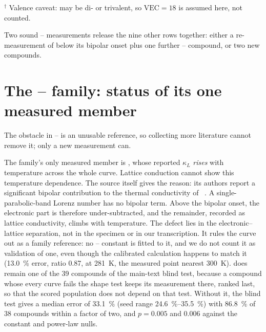 \documentclass[preprint, 12pt]{elsarticle}
\begin{document}
\begin{table}[htb]
  \vspace{2pt}
  \begin{minipage}{\linewidth}\footnotesize
    $^{\dagger}$ Valence caveat:  may be di- or trivalent, so $\mathrm{VEC}=18$ is assumed here, not
    counted.\par
    Two sound -- measurements release the nine other rows together: either a
    re-measurement of  below its bipolar onset plus one further -- compound,
    or two new compounds.
  \end{minipage}
\end{table}

\section{The \texorpdfstring{--}{Ni-Bi} family: status of its one measured member}
\label{sec:nibi}

The obstacle in -- is an unusable reference, so collecting more literature cannot
remove it; only a new measurement can.

The family's only measured member is , whose reported $\kappa_L$ \emph{rises} with
temperature across the whole curve. Lattice conduction cannot show this temperature dependence. The
source itself gives the reason: its authors report a significant bipolar contribution to the thermal
conductivity of ~\cite{li2015synthesis}. A single-parabolic-band Lorenz number has no
bipolar term. Above the bipolar onset, the electronic part is therefore under-subtracted, and the
remainder, recorded as lattice conductivity, climbs with temperature. The defect lies in the
electronic--lattice separation, not in the specimen or in our transcription. It rules the curve out
as a family reference: no -- constant is fitted to it, and we do not count it as
validation of one, even though the calibrated calculation happens to match it
(\SI{13.0}{\percent} error, ratio \num{0.87}, at \SI{281}{\kelvin}, the measured point nearest
\SI{300}{\kelvin}).  does remain one of the \num{39} compounds of the main-text blind
test, because a compound whose every curve fails the shape test keeps its measurement there, ranked
last, so that the scored population does not depend on that test. Without it, the blind test gives
a median error of \SI{33.1}{\percent} (seed range \SIrange{24.6}{35.5}{\percent}) with
\SI{86.8}{\percent} of \num{38} compounds within a factor of two, and $p=\num{0.005}$ and
\num{0.006} against the constant and power-law nulls.
\end{document}
